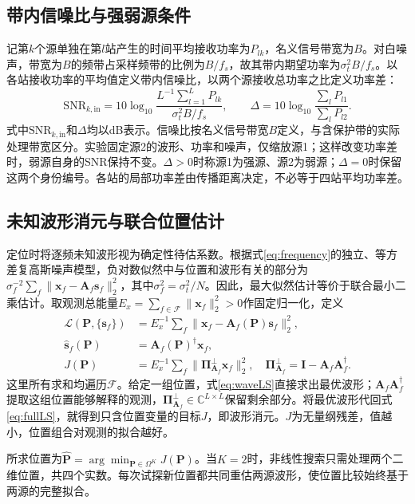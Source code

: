 \documentclass[a4paper,fleqn]{cas-sc}
\numberwithin{equation}{section}
\numberwithin{figure}{section}
\numberwithin{table}{section}
\newcommand{\C}{\mathbb C}
\begin{document}
\subsection{带内信噪比与强弱源条件}
记第$k$个源单独在第$l$站产生的时间平均接收功率为$P_{lk}$，名义信号带宽为$B$。对白噪声，带宽为$B$的频带占采样频带的比例为$B/f_s$，故其带内期望功率为$\sigma_t^2B/f_s$。以各站接收功率的平均值定义带内信噪比，以两个源接收总功率之比定义功率差：
\begin{equation}
 \mathrm{SNR}_{k,\mathrm{in}}
 =10\log_{10}\frac{L^{-1}\sum_{l=1}^L P_{lk}}
 {\sigma_t^2B/f_s},\qquad
 \Delta=10\log_{10}\frac{\sum_l P_{l1}}{\sum_l P_{l2}} .
 \label{eq:snr}
\end{equation}
式中$\mathrm{SNR}_{k,\mathrm{in}}$和$\Delta$均以dB表示。信噪比按名义信号带宽$B$定义，与含保护带的实际处理带宽区分。实验固定源2的波形、功率和噪声，仅缩放源1；这样改变功率差时，弱源自身的SNR保持不变。$\Delta>0$时称源1为强源、源2为弱源；$\Delta=0$时保留这两个身份编号。各站的局部功率差由传播距离决定，不必等于四站平均功率差。

\subsection{未知波形消元与联合位置估计}
定位时将逐频未知波形视为确定性待估系数。根据式\eqref{eq:frequency}的独立、等方差复高斯噪声模型，负对数似然中与位置和波形有关的部分为$\sigma_f^{-2}\sum_f\|\bm x_f-\bm A_f\bm s_f\|_2^2$，其中$\sigma_f^2=\sigma_t^2/N$。因此，最大似然估计等价于联合最小二乘估计\cite{ChenHudsonYao2002}。取观测总能量$E_x=\sum_{f\in\mathcal F}\|\bm x_f\|_2^2>0$作固定归一化，定义
\begin{align}
 \mathcal L(\bm P,\{\bm s_f\})
   &=E_x^{-1}\sum_f\|\bm x_f-\bm A_f(\bm P)\bm s_f\|_2^2,\label{eq:fullLS}\\
 \widehat{\bm s}_f(\bm P)&=\bm A_f(\bm P)^\dagger\bm x_f,\label{eq:waveLS}\\
 J(\bm P)&=E_x^{-1}\sum_f\|\bm\Pi_{\bm A_f}^{\perp}\bm x_f\|_2^2,
 \quad \bm\Pi_{\bm A_f}^{\perp}=\bm I-\bm A_f\bm A_f^\dagger .\label{eq:profile}
\end{align}
这里所有求和均遍历$\mathcal F$。给定一组位置，式\eqref{eq:waveLS}直接求出最优波形；$\bm A_f\bm A_f^\dagger$提取这组位置能够解释的观测，$\bm\Pi_{\bm A_f}^{\perp}\in\C^{L\times L}$保留剩余部分。将最优波形代回式\eqref{eq:fullLS}，就得到只含位置变量的目标$J$，即波形消元\cite{GolubPereyra1973}。$J$为无量纲残差，值越小，位置组合对观测的拟合越好。

所求位置为$\widehat{\bm P}=\arg\min_{\bm P\in\Omega^K}J(\bm P)$。当$K=2$时，非线性搜索只需处理两个二维位置，共四个实数。每次试探新位置都共同重估两源波形，使位置比较始终基于两源的完整拟合。
\end{document}
